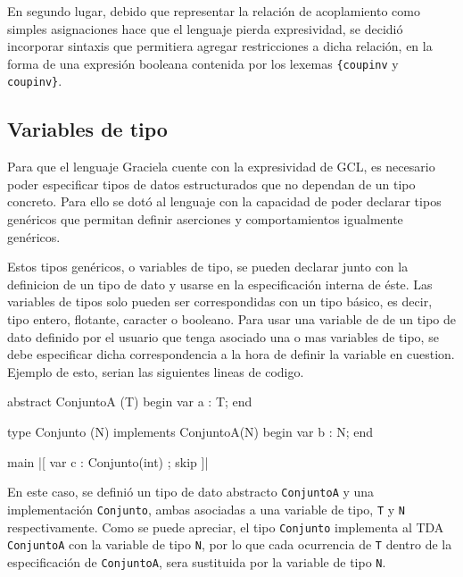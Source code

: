 En segundo lugar, debido que representar la relación de acoplamiento como
simples asignaciones hace que el lenguaje pierda expresividad, se decidió
incorporar sintaxis que permitiera agregar restricciones a dicha relación, en
la forma de una expresión booleana contenida por los lexemas
\texttt{\{coupinv} y \texttt{coupinv\}}.




\subsection{Variables de tipo}
Para que el lenguaje Graciela cuente con la expresividad de GCL, es necesario
poder especificar tipos de datos estructurados que no dependan de un tipo
concreto. Para ello se dotó al lenguaje con la capacidad de poder declarar
tipos genéricos que permitan definir aserciones y comportamientos igualmente
genéricos.

Estos tipos genéricos, o variables de tipo, se pueden declarar junto con la
definicion de un tipo de dato y usarse en la especificación interna de éste.
Las variables de tipos solo pueden ser correspondidas con un tipo básico, es
decir, tipo entero, flotante, caracter o booleano. Para usar una variable de
de un tipo de dato definido por el usuario que tenga asociado una o mas variables
de tipo, se debe especificar dicha correspondencia a la hora de definir la
variable en cuestion. Ejemplo de esto, serian las siguientes lineas de codigo.
 
\begin{gracielacode}
  abstract ConjuntoA (T) begin
    var a : T;
  end

  type Conjunto (N) implements ConjuntoA(N) begin
    var b : N;
  end

  main
   |[ var c : Conjunto(int)
    ; skip 
   ]|

\end{gracielacode}

En este caso, se definió un tipo de dato abstracto \texttt{ConjuntoA} y una
implementación \texttt{Conjunto}, ambas asociadas a una variable de
tipo, \texttt{T} y \texttt{N} respectivamente. Como se puede apreciar, el tipo
\texttt{Conjunto} implementa al TDA \texttt{ConjuntoA} con la
variable de tipo \texttt{N}, por lo que cada ocurrencia de \texttt{T} dentro
de la especificación de \texttt{ConjuntoA}, sera sustituida por la variable de
tipo \texttt{N}.

